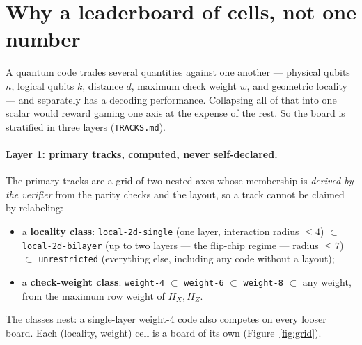 \documentclass[11pt]{article}
\newcommand{\HX}{H_X}
\newcommand{\HZ}{H_Z}
\begin{document}
	\section{Why a leaderboard of cells, not one number}

	A quantum code trades several quantities against one another --- physical
	qubits $n$, logical qubits $k$, distance $d$, maximum check weight $w$, and
	geometric locality --- and separately has a decoding performance.
	Collapsing all of that into one scalar would reward gaming one axis at the
	expense of the rest. So the board is stratified in three layers
	(\texttt{TRACKS.md}).

	\paragraph{Layer 1: primary tracks, computed, never self-declared.} The
	primary tracks are a grid of two nested axes whose membership is
	\emph{derived by the verifier} from the parity checks and the layout, so a
	track cannot be claimed by relabeling:
	\begin{itemize}[nosep]
		\item a \textbf{locality class}: \texttt{local-2d-single} (one layer,
		interaction radius $\le 4$) $\subset$ \texttt{local-2d-bilayer} (up to
		two layers --- the flip-chip regime --- radius $\le 7$) $\subset$
		\texttt{unrestricted} (everything else, including any code without a
		layout);
		\item a \textbf{check-weight class}: \texttt{weight-4} $\subset$
		\texttt{weight-6} $\subset$ \texttt{weight-8} $\subset$ any weight,
		from the maximum row weight of $\HX,\HZ$.
	\end{itemize}
	The classes nest: a single-layer weight-4 code also competes on every
	looser board. Each (locality, weight) cell is a board of its own
	(Figure~\ref{fig:grid}).
\end{document}
